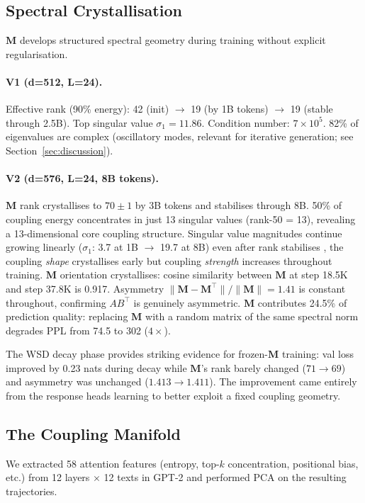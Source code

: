 \documentclass[10pt,twocolumn]{article}
\newcommand{\M}{\mathbf{M}}
\begin{document}
\subsection{Spectral Crystallisation}

$\M$ develops structured spectral geometry during training without explicit regularisation.

\paragraph{V1 (d=512, L=24).}
Effective rank (90\% energy): 42 (init) $\to$ 19 (by 1B tokens) $\to$ 19 (stable through 2.5B).
Top singular value $\sigma_1 = 11.86$.
Condition number: $7 \times 10^5$.
82\% of eigenvalues are complex (oscillatory modes, relevant for iterative generation; see Section~\ref{sec:discussion}).

\paragraph{V2 (d=576, L=24, 8B tokens).}
$\M$ rank crystallises to $70 \pm 1$ by 3B tokens and stabilises through 8B.
50\% of coupling energy concentrates in just 13 singular values (rank-50 = 13), revealing a 13-dimensional core coupling structure.
Singular value magnitudes continue growing linearly ($\sigma_1$: 3.7 at 1B $\to$ 19.7 at 8B) even after rank stabilises ,  the coupling \emph{shape} crystallises early but coupling \emph{strength} increases throughout training.
$\M$ orientation crystallises: cosine similarity between $\M$ at step 18.5K and step 37.8K is 0.917.
Asymmetry $\|\M - \M^\top\|/\|\M\| = 1.41$ is constant throughout, confirming $AB^\top$ is genuinely asymmetric.
$\M$ contributes 24.5\% of prediction quality: replacing $\M$ with a random matrix of the same spectral norm degrades PPL from 74.5 to 302 ($4\times$).

The WSD decay phase provides striking evidence for frozen-$\M$ training: val loss improved by 0.23 nats during decay while $\M$'s rank barely changed ($71 \to 69$) and asymmetry was unchanged ($1.413 \to 1.411$). The improvement came entirely from the response heads learning to better exploit a fixed coupling geometry.

\subsection{The Coupling Manifold}

We extracted 58 attention features (entropy, top-$k$ concentration, positional bias, etc.) from 12 layers $\times$ 12 texts in GPT-2 and performed PCA on the resulting trajectories.
\end{document}
